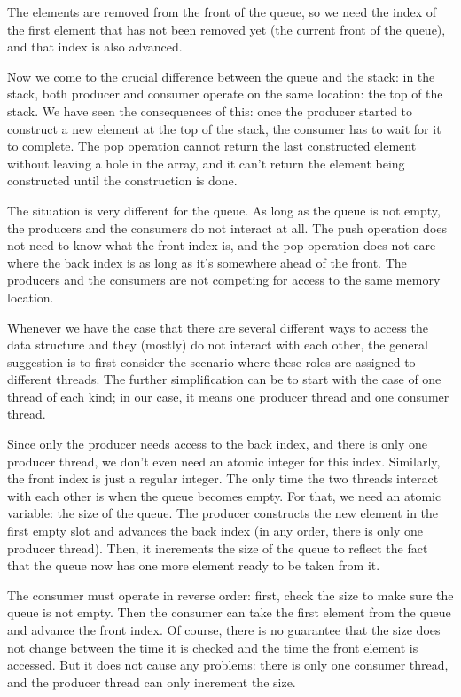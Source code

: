 The elements are removed from the front of the queue, so we need the index of the first element that has not been removed yet (the current front of the queue), and that index is also advanced. 

Now we come to the crucial difference between the queue and the stack: in the stack, both producer and consumer operate on the same location: the top of the stack. We have seen the consequences of this: once the producer started to construct a new element at the top of the stack, the consumer has to wait for it to complete. The pop operation cannot return the last constructed element without leaving a hole in the array, and it can't return the element being constructed until the construction is done.

The situation is very different for the queue. As long as the queue is not empty, the producers and the consumers do not interact at all. The push operation does not need to know what the front index is, and the pop operation does not care where the back index is as long as it's somewhere ahead of the front. The producers and the consumers are not competing for access to the same memory location. 

Whenever we have the case that there are several different ways to access the data structure and they (mostly) do not interact with each other, the general suggestion is to first consider the scenario where these roles are assigned to different threads. The further simplification can be to start with the case of one thread of each kind; in our case, it means one producer thread and one consumer thread. 

Since only the producer needs access to the back index, and there is only one producer thread, we don't even need an atomic integer for this index. Similarly, the front index is just a regular integer. The only time the two threads interact with each other is when the queue becomes empty. For that, we need an atomic variable: the size of the queue. The producer constructs the new element in the first empty slot and advances the back index (in any order, there is only one producer thread). Then, it increments the size of the queue to reflect the fact that the queue now has one more element ready to be taken from it. 

The consumer must operate in reverse order: first, check the size to make sure the queue is not empty. Then the consumer can take the first element from the queue and advance the front index. Of course, there is no guarantee that the size does not change between the time it is checked and the time the front element is accessed. But it does not cause any problems: there is only one consumer thread, and the producer thread can only increment the size. 

